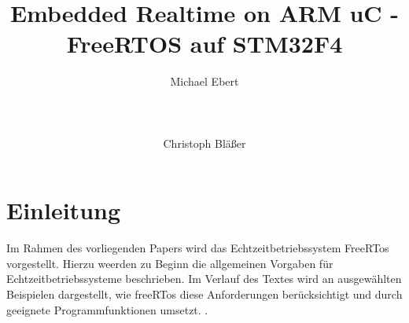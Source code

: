 \documentclass[ngerman]{seminarvorlage}
\begin{document}
\title{Embedded Realtime on ARM uC - FreeRTOS auf STM32F4}
\author{
  \alignauthor Michael Ebert\\
    \\
		\\
    \\
  \alignauthor Christoph Bläßer\\
}

\maketitle



\section{Einleitung}

Im Rahmen des vorliegenden Papers wird das Echtzeitbetriebssystem FreeRTos vorgestellt. Hierzu weerden zu Beginn die allgemeinen Vorgaben für Echtzeitbetriebssysteme beschrieben. Im Verlauf des Textes wird an ausgewählten Beispielen dargestellt, wie freeRTos diese Anforderungen berücksichtigt und durch geeignete Programmfunktionen umsetzt. \cite{acmcategories,Ivory2001}.
\end{document}
